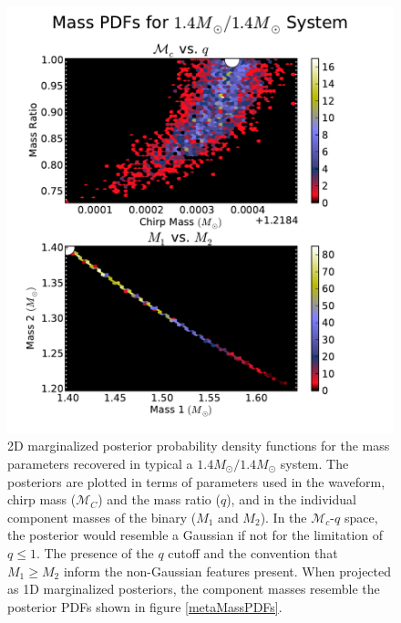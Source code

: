 \documentclass[11pt,a4paper]{emulateapj}
\newcommand{\chmass}{\mathcal{M}_c}
\begin{document}
\begin{figure}[h!]
  \centering
 \includegraphics[trim=1cm 0cm 2cm 0cm, clip=false,scale=0.63]{1414masses2D.pdf}
 \caption{2D marginalized posterior probability density functions for the mass parameters recovered in typical a $1.4M_{\odot}/1.4M_{\odot}$ system.  The posteriors are plotted in terms of parameters used in the waveform, chirp mass ($\mathcal{M}_C$) and the mass ratio ($q$), and in the individual component masses of the binary ($M_1$ and $M_2$).  In the $\chmass$-$q$ space, the posterior would resemble a Gaussian if not for the limitation of $q \leq 1$.  The presence of the $q$ cutoff and the convention that $M_1 \geq M_2$ inform the non-Gaussian features present.  When projected as 1D marginalized posteriors, the component masses resemble the posterior PDFs shown in figure \ref{metaMassPDFs}.}
  \label{1414masses}
\end{figure}
\end{document}
